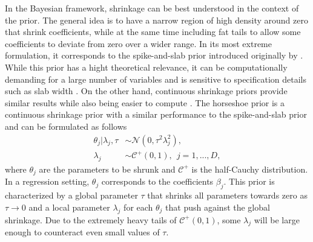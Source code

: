 In the Bayesian framework, shrinkage can be best understood in the context of the prior.
The general idea is to have a narrow region of high density around zero that shrink coefficients,
while at the same time including fat tails to allow some coefficients to deviate from zero over a wider range.
In its most extreme formulation, it corresponds to the spike-and-slab prior introduced originally by \cite{mitchell_bayesian_1988}.
While this prior has a hight theoretical relevance, it can be computationally demanding for a large number of variables and is sensitive to specification details such as slab width \citep{piironen_sparsity_2017}.
On the other hand, continuous shrinkage priors \cite{} provide similar results while also being easier to compute \citep{piironen_sparsity_2017}.
The horseshoe prior \cite{carvalho_horseshoe_2010} is a continuous shrinkage prior with a similar performance to the spike-and-slab prior and can be formulated as follows
\begin{equation}
    \begin{split}
        \theta_j | \lambda_j, \tau & \sim \mathcal N (0, \tau^2\lambda^2_j), \\
        \lambda_j & \sim \mathcal C^+ (0, 1), ~~ j = 1,..., D,
    \end{split}
    \label{eq_hs}
\end{equation}
where $\theta_j$ are the parameters to be shrunk and $\mathcal C^+$ is the half-Cauchy distribution. In a regression setting, $\theta_j$ corresponds to the coefficients $\beta_j$.
This prior is characterized by a global parameter $\tau$ that shrinks all parameters towards zero as $\tau \rightarrow 0$ and a local parameter $\lambda_j$ for each $\theta_j$ that push against the global shrinkage.
Due to the extremely heavy tails of $\mathcal C^+(0, 1)$, some $\lambda_j$ will be large enough to counteract even small values of $\tau$.

